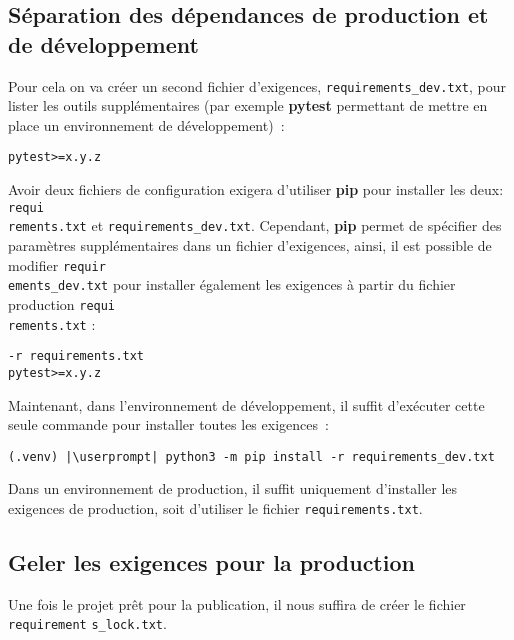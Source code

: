 \subsection*{Séparation des dépendances de production et de développement}
Pour cela on va créer un second fichier d'exigences, \texttt{requirements\_dev.txt}, pour lister les outils supplémentaires (par exemple \textbf{pytest} permettant de mettre en place un environnement de développement) :
\begin{lstlisting}[style=file]
pytest>=x.y.z
\end{lstlisting}

Avoir deux fichiers de configuration exigera d'utiliser \textbf{pip} pour installer les deux: \texttt{requi\\rements.txt} et \texttt{requirements\_dev.txt}. Cependant, \textbf{pip} permet de spécifier des paramètres supplémentaires dans un fichier d'exigences, ainsi, il est possible de modifier \texttt{requir\\ements\_dev.txt} pour installer également les exigences à partir du fichier production \texttt{requi\\rements.txt} :
\begin{lstlisting}[style=file]
-r requirements.txt
pytest>=x.y.z
\end{lstlisting}

Maintenant, dans l'environnement de développement, il suffit d’exécuter cette seule commande pour installer toutes les exigences :
\begin{lstlisting}[style=bash]
(.venv) |\userprompt| python3 -m pip install -r requirements_dev.txt
\end{lstlisting}

Dans un environnement de production, il suffit uniquement d’installer les exigences de production, soit d'utiliser le fichier \texttt{requirements.txt}.

\subsection*{Geler les exigences pour la production}
Une fois le projet prêt pour la publication, il nous suffira de créer le fichier \texttt{requirement} \texttt{s\_lock.txt}.

